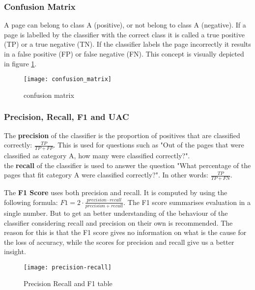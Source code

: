 \subsubsection{Confusion Matrix}
A page can belong to class A (positive), or not belong to class A (negative). If a page is labelled by the classifier with the correct class it is called a true positive (TP) or a true negative (TN). If the classifier labels the page incorrectly it results in a false positive (FP) or false negative (FN). This concept is visually depicted in figure \ref{fig:confusion_matrix}. 

\begin{figure}[ht]
\centering
\texttt{[image: confusion\_matrix]}
\caption{confusion matrix \protect\footnotemark{}}
\label{fig:confusion_matrix}
\end{figure}

\subsubsection{Precision, Recall, F1 and UAC}\label{sec:classification-validation}
The \textbf{precision} of the classifier is the proportion of positives that are classified correctly: $\frac{TP}{TP+FP}$. This is used for questions such as "Out of the pages that were classified as category A, how many were classified correctly?".\\

the \textbf{recall} of the classifier is used to answer the question "What percentage of the pages that fit category A were classified correctly?". In other words: $\frac{TP}{TP+FN}$.

The \textbf{F1 Score} uses both precision and recall. It is computed by using the following formula: $F1 = 2\cdot \frac{precision \cdot recall}{precision + recall}$. The F1 score summarises evaluation in a single number. But to get an better understanding of the behaviour of the classifier considering recall and precision on their own is recommended. The reason for this is that the F1 score gives no information on what is the cause for the loss of accuracy, while the scores for precision and recall give us a better insight.\\

\begin{figure}[ht]
\centering
\texttt{[image: precision-recall]}
\caption{Precision Recall and F1 table}
\label{fig:prec-rec}
\end{figure}

